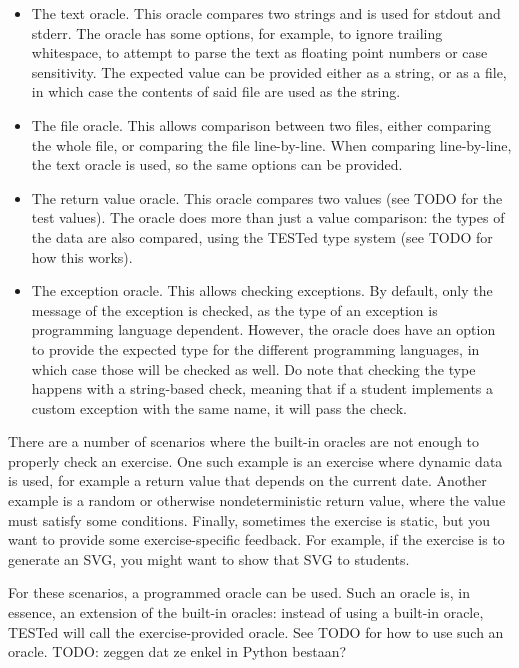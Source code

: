 \documentclass[../main]{subfiles}
\begin{document}
\begin{itemize}
    \item The text oracle.
          This oracle compares two strings and is used for stdout and stderr.
          The oracle has some options, for example, to ignore trailing whitespace, to attempt to parse the text as floating point numbers or case sensitivity.
          The expected value can be provided either as a string, or as a file, in which case the contents of said file are used as the string.
    \item The file oracle.
          This allows comparison between two files, either comparing the whole file, or comparing the file line-by-line.
          When comparing line-by-line, the text oracle is used, so the same options can be provided.
    \item The return value oracle.
          This oracle compares two values (see TODO for the test values).
          The oracle does more than just a value comparison: the types of the data are also compared, using the TESTed type system (see TODO for how this works).
    \item The exception oracle.
          This allows checking exceptions.
          By default, only the message of the exception is checked, as the type of an exception is programming language dependent.
          However, the oracle does have an option to provide the expected type for the different programming languages, in which case those will be checked as well.
          Do note that checking the type happens with a string-based check, meaning that if a student implements a custom exception with the same name, it will pass the check.
\end{itemize}

There are a number of scenarios where the built-in oracles are not enough to properly check an exercise.
One such example is an exercise where dynamic data is used, for example a return value that depends on the current date.
Another example is a random or otherwise nondeterministic return value, where the value must satisfy some conditions.
Finally, sometimes the exercise is static, but you want to provide some exercise-specific feedback.
For example, if the exercise is to generate an SVG, you might want to show that SVG to students.

For these scenarios, a programmed oracle can be used.
Such an oracle is, in essence, an extension of the built-in oracles: instead of using a built-in oracle, TESTed will call the exercise-provided oracle.
See TODO for how to use such an oracle.
TODO: zeggen dat ze enkel in Python bestaan?
\end{document}
